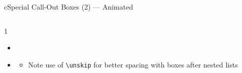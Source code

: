 \begin{myslidefragile}{c}{Special Call-Out Boxes (2) --- Animated}

\begin{columns}

\begin{column}{1\textwidth}

\begin{itemize}[<+->]

\itembox
\begin{myremark}
\lipsum[1][1]
\end{myremark}

\item \lipsum[1][6]%

\itembox
\begin{myimportant}
\lipsum[1][1-2]
\end{myimportant}

\itembox
\begin{myfuture}
\lipsum[1][1]
\end{myfuture}

\item \lipsum[1][6]

\begin{itemize}

\item Note use of \lstinline{\unskip} for better spacing with boxes after nested lists

\end{itemize}

\unskip

\itembox
\begin{myquestion}
\lipsum[1][2-3]
\end{myquestion}

\end{itemize}

\end{column}

\end{columns}
\end{myslidefragile}

